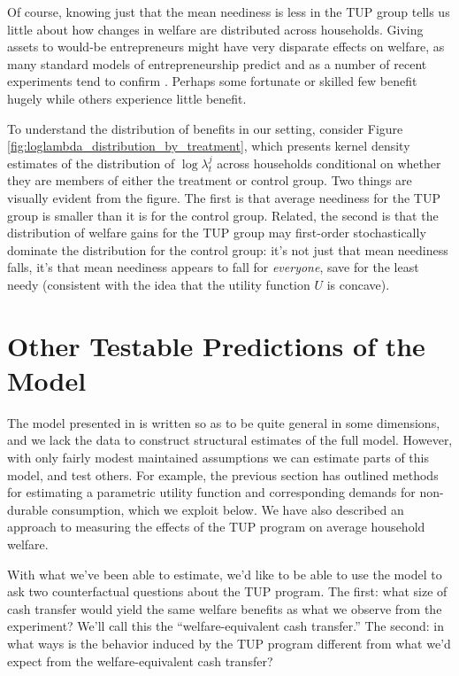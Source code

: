 \documentclass[11pt]{article}
\newcommand{\Fig}[1]{Figure \ref{fig:#1}} \newcommand{\Tab}[1]{Table \ref{tab:#1}}
\begin{document}
Of course, knowing just that the mean neediness is less in the TUP
group tells us little about how changes in welfare are distributed
across households.  Giving assets to would-be entrepreneurs might have
very disparate effects on welfare, as many standard models of
entrepreneurship predict
\citep{banerjee-newman93,paulson-etal06,karaivanov-townsend14} and as
a number of recent experiments tend to confirm \citep{demel-etal08,mckenzie-woodruff08,fafchamps-etal11}.
Perhaps some fortunate or skilled few benefit hugely while others
experience little benefit.  

To understand the distribution of benefits in our setting, consider
\Fig{loglambda_distribution_by_treatment}, which presents kernel
density estimates of the distribution of $\log\lambda^j_t$ across
households conditional on whether they are members of either the
treatment or control group.  Two things are visually evident from the
figure.  The first is that average neediness for the TUP group is
smaller than it is for the control group.  Related, the second is that
the distribution of welfare gains for the TUP group may first-order
stochastically dominate the distribution for the control group: it's
not just that mean neediness falls, it's that mean neediness appears
to fall for \emph{everyone}, save for the least needy (consistent with the
idea that the utility function $U$ is concave).  


\section*{Other Testable Predictions of the Model}
\label{sec-7}
The model presented in  is written so as to be quite
general in some dimensions, and we lack the data to construct
structural estimates of the full model.  However, with only fairly
modest maintained assumptions we can estimate parts of this model,
and test others.  For example, the previous section has outlined
methods for estimating a parametric utility function and
corresponding demands for non-durable consumption, which we exploit
below.  We have also described an approach to measuring the effects
of the TUP program on average household welfare.

With what we've been able to estimate, we'd like to be able to use
the model to ask two counterfactual questions about the TUP
program.  The first: what size of cash transfer would yield the
same welfare benefits as what we observe from the experiment?
We'll call this the ``welfare-equivalent cash transfer.''  The
second: in what ways is the behavior induced by the TUP program
different from what we'd expect from the welfare-equivalent cash
transfer?
\end{document}
